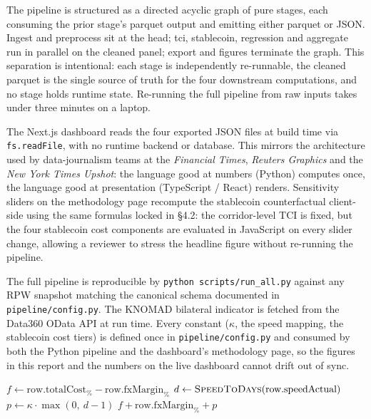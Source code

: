 \documentclass[
  11pt,
]{article}
\begin{document}
The pipeline is structured as a directed acyclic graph of pure stages,
each consuming the prior stage's parquet output and emitting either
parquet or JSON. Ingest and preprocess sit at the head; tci, stablecoin,
regression and aggregate run in parallel on the cleaned panel; export
and figures terminate the graph. This separation is intentional: each
stage is independently re-runnable, the cleaned parquet is the single
source of truth for the four downstream computations, and no stage holds
runtime state. Re-running the full pipeline from raw inputs takes under
three minutes on a laptop.

The Next.js dashboard reads the four exported JSON files at build time
via \texttt{fs.readFile}, with no runtime backend or database. This
mirrors the architecture used by data-journalism teams at the
\emph{Financial Times}, \emph{Reuters Graphics} and the \emph{New York
Times Upshot}: the language good at numbers (Python) computes once, the
language good at presentation (TypeScript / React) renders. Sensitivity
sliders on the methodology page recompute the stablecoin counterfactual
client-side using the same formulas locked in §4.2: the corridor-level
TCI is fixed, but the four stablecoin cost components are evaluated in
JavaScript on every slider change, allowing a reviewer to stress the
headline figure without re-running the pipeline.

The full pipeline is reproducible by
\texttt{python\ scripts/run\_all.py} against any RPW snapshot matching
the canonical schema documented in \texttt{pipeline/config.py}. The
KNOMAD bilateral indicator is fetched from the Data360 OData API at run
time. Every constant (\(\kappa\), the speed mapping, the stablecoin cost
tiers) is defined once in \texttt{pipeline/config.py} and consumed by
both the Python pipeline and the dashboard's methodology page, so the
figures in this report and the numbers on the live dashboard cannot
drift out of sync.

\begin{algorithm}[h]
\caption{TCI computation per (provider $\times$ corridor $\times$ quarter $\times$ amount)}
\begin{algorithmic}[1]
  \State $f \gets \text{row.totalCost}_\% - \text{row.fxMargin}_\%$ 
  \State $d \gets \textsc{SpeedToDays}(\text{row.speedActual})$
  \State $p \gets \kappa \cdot \max(0,\ d - 1)$
  \State \Return $f + \text{row.fxMargin}_\% + p$
\EndProcedure
\end{algorithmic}
\end{algorithm}
\end{document}
